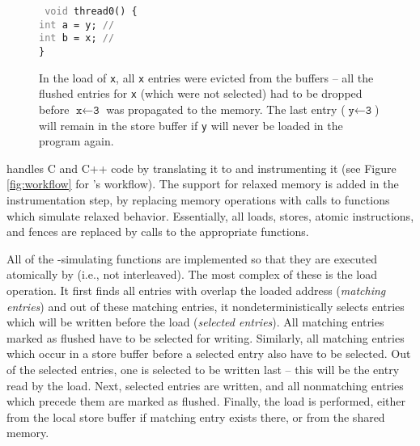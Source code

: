 \begin{figure}[th]
\begin{minipage}[t]{\colwidth}
\begin{tikzpicture}
\end{tikzpicture}

\begingroup
    \tt
    \textcolor{gray}{void} thread0() \{ \\
    \indent{}\textcolor{gray}{int} a = y; \textcolor{gray}{// } \\
    \indent{}\textcolor{gray}{int} b = x; \textcolor{gray}{// } \\
    \}
\endgroup

\caption{
In the load of \texttt{x}, all \texttt{x} entries were evicted from the buffers -- all the flushed entries for \texttt{x} (which were not selected) had to be dropped before \mbox{$\texttt{x} \leftarrow \texttt{3}$} was propagated to the memory.
The last entry (\mbox{$\texttt{y} \leftarrow \texttt{3}$}) will remain in the store buffer if \texttt{y} will never be loaded in the program again.
}

\label{fig:flushflagC}

\end{minipage}
\end{figure}

\bigskip


\divine handles C and C++ code by translating it to \llvm and instrumenting it (see Figure \ref{fig:workflow} for \divine's workflow).
The support for relaxed memory is added in the instrumentation step, by replacing memory operations with calls to functions which simulate relaxed behavior.
Essentially, all loads, stores, atomic instructions, and fences are replaced by calls to the appropriate functions.

All of the \xtso-simulating functions are implemented so that they are executed atomically by \divine (i.e., not interleaved).
The most complex of these is the load operation.
It first finds all entries with overlap the loaded address (\emph{matching entries}) and out of these matching entries, it nondeterministically selects entries which will be written before the load (\emph{selected entries}).
All matching entries marked as flushed have to be selected for writing.
Similarly, all matching entries which occur in a store buffer before a selected entry also have to be selected.
Out of the selected entries, one is selected to be written last -- this will be the entry read by the load.
Next, selected entries are written, and all nonmatching entries which precede them are marked as flushed.
Finally, the load is performed, either from the local store buffer if matching
entry exists there, or from the shared memory.

